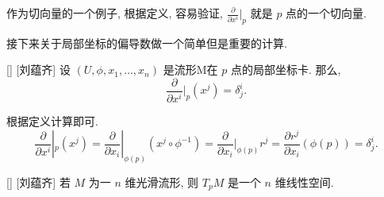 \documentclass[UTF8]{ctexart}
\begin{document}
        \begin{rmk}
            []
            作为切向量的一个例子, 根据定义, 容易验证,  \(\frac{\partial}{\partial x^i} |_p\) 就是 \(p\) 点的一个切向量. 
        \end{rmk}

        接下来关于局部坐标的偏导数做一个简单但是重要的计算. 
        
        \begin{ppt}
            []
            {}
            []
            [刘蕴齐]
            设 \((U, \phi, x_1, \dots, x_n)\) 是流形M在 \(p\) 点的局部坐标卡. 那么, 
            \[
                \frac{\partial}{\partial x^i} |_p (x^j) = \delta^i_{j}.
            \]
        \end{ppt}

        \begin{prf}
            根据定义计算即可. 
            \[
            \frac{\partial}{\partial x^i} |_p (x^j)
            =
            \frac{\partial}{\partial x_i}|_{\phi(p)} (x^j \circ \phi^{-1} )
            =
            \frac{\partial}{\partial x_i}|_{\phi(p)} r^j
            =
            \frac{\partial r^j}{\partial x_i}(\phi(p))
            =
            \delta^i_{j}.
            \]
        \end{prf}
        
        \begin{thm}
            []
            {}
            []
            [刘蕴齐]
            若 \(M\) 为一 \(n\) 维光滑流形, 则 \(T_p M\) 是一个 \(n\) 维线性空间. 
        \end{thm}
        
\end{document}

